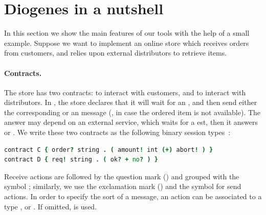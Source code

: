 \section{Diogenes in a nutshell}

In this section we show the main features of our tools
with the help of a small example.
Suppose we want to implement an online store which 
receives orders from customers,
and relies upon external distributors to retrieve items.

\paragraph{Contracts.}
The store has two contracts:
 to interact with customers, and
 to interact with distributors.
In , the store declares that it will wait for an ,
and then send either the corresponding  or an  message
(\eg, in case the ordered item is not available).
%
The answer may depend on an external service, 
which waits for a est, then it answers  or .
% 
We write these two contracts as the following 
binary session types~\cite{Honda98esop}:
% 
\begin{lstlisting}[language=coco,basicstyle=\scriptsize\ttfamily]
contract C { order? string . ( amount! int (+) abort! ) }
contract D { req! string . ( ok? + no? ) }
\end{lstlisting}
Receive actions are followed by the question mark () and grouped
with the symbol \code{+}; similarly, we use the
exclamation mark (\code{!}) and the symbol \code{(+)} for
send actions. 
In order to specify the sort of a message, 
an action can be associated to a type
,  or .
If omitted,  is used.


